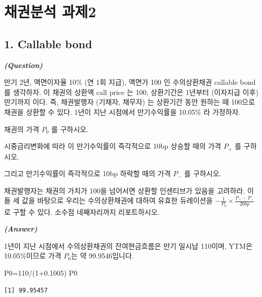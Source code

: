 \documentclass[
  letterpaper,
  DIV=11,
  numbers=noendperiod]{scrreprt}
\newenvironment{Shaded}{\begin{snugshade}}{\end{snugshade}}
\newcommand{\DecValTok}[1]{\textcolor[rgb]{0.68,0.00,0.00}{#1}}
\newcommand{\FloatTok}[1]{\textcolor[rgb]{0.68,0.00,0.00}{#1}}
\newcommand{\NormalTok}[1]{\textcolor[rgb]{0.00,0.23,0.31}{#1}}
\newcommand{\OtherTok}[1]{\textcolor[rgb]{0.00,0.23,0.31}{#1}}
\newcommand{\SpecialCharTok}[1]{\textcolor[rgb]{0.37,0.37,0.37}{#1}}
\begin{document}
\chapter*{채권분석 과제2}\label{uxcc44uxad8cuxbd84uxc11d-uxacfcuxc81c2}


\section*{1. Callable bond}\label{callable-bond}


\textbf{\emph{(Question)}}

만기 2년, 액면이자율 10\% (연 1회 지급), 액면가 100 인 수의상환채권
callable bond 를 생각하자. 이 채권의 상환액 call price 는 100,
상환기간은 1년부터 (이자지급 이후) 만기까지 이다. 즉, 채권발행자
(기채자, 채무자) 는 상환기간 동안 원하는 때 100으로 채권을 상환할 수
있다. 1년이 지난 시점에서 만기수익률을 10.05\% 라 가정하자.

채권의 가격 \(P_0\) 를 구하시오.

시중금리변화에 따라 이 만기수익률이 즉각적으로 10bp 상승할 때의 가격
\(P_+\) 를 구하시오.

그리고 만기수익률이 즉각적으로 10bp 하락할 때의 가격 \(P_−\) 를
구하시오.

채권발행자는 채권의 가치가 100을 넘어서면 상환할 인센티브가 있음을
고려하라. 이들 세 값을 바탕으로 우리는 수의상환채권에 대하여 유효한
듀레이션을 \(-\frac{1}{P_0}\times\frac{P_+-P_-}{20bp}\)로 구할 수 있다.
소수점 네째자리까지 리포트하시오.

\textbf{\emph{(Answer)}}

1년이 지난 시점에서 수의상환채권의 잔여현금흐름은 만기 일시납 110이며,
YTM은 10.05\%이므로 가격 \(P_0\)는 약 99.9546입니다.

\begin{Shaded}
\begin{Highlighting}[]
\NormalTok{P0}\OtherTok{=}\DecValTok{110}\SpecialCharTok{/}\NormalTok{(}\DecValTok{1}\FloatTok{+0.1005}\NormalTok{)}
\NormalTok{P0}
\end{Highlighting}
\end{Shaded}

\begin{verbatim}
[1] 99.95457
\end{verbatim}
\end{document}
